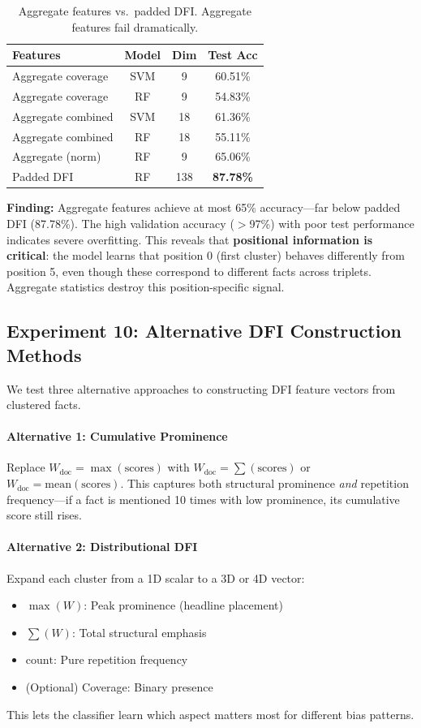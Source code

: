 \documentclass[11pt]{article}
\begin{document}
\begin{table}[h]
\centering
\small
\begin{tabular}{lccc}
\toprule
\textbf{Features} & \textbf{Model} & \textbf{Dim} & \textbf{Test Acc} \\
\midrule
Aggregate coverage & SVM & 9 & 60.51\% \\
Aggregate coverage & RF & 9 & 54.83\% \\
Aggregate combined & SVM & 18 & 61.36\% \\
Aggregate combined & RF & 18 & 55.11\% \\
Aggregate (norm) & RF & 9 & 65.06\% \\
\midrule
Padded DFI & RF & 138 & \textbf{87.78\%} \\
\bottomrule
\end{tabular}
\caption{Aggregate features vs.\ padded DFI. Aggregate features fail dramatically.}
\label{tab:aggregate}
\end{table}

\textbf{Finding:} Aggregate features achieve at most 65\% accuracy---far below padded DFI (87.78\%). The high validation accuracy ($>$97\%) with poor test performance indicates severe overfitting. This reveals that \textbf{positional information is critical}: the model learns that position 0 (first cluster) behaves differently from position 5, even though these correspond to different facts across triplets. Aggregate statistics destroy this position-specific signal.

\subsection{Experiment 10: Alternative DFI Construction Methods}

We test three alternative approaches to constructing DFI feature vectors from clustered facts.

\paragraph{Alternative 1: Cumulative Prominence}
Replace $W_{\text{doc}} = \max(\text{scores})$ with $W_{\text{doc}} = \sum(\text{scores})$ or $W_{\text{doc}} = \text{mean}(\text{scores})$. This captures both structural prominence \emph{and} repetition frequency---if a fact is mentioned 10 times with low prominence, its cumulative score still rises.

\paragraph{Alternative 2: Distributional DFI}
Expand each cluster from a 1D scalar to a 3D or 4D vector:
\begin{itemize}
    \item $\max(W)$: Peak prominence (headline placement)
    \item $\sum(W)$: Total structural emphasis
    \item $\text{count}$: Pure repetition frequency
    \item (Optional) Coverage: Binary presence
\end{itemize}
This lets the classifier learn which aspect matters most for different bias patterns.
\end{document}
